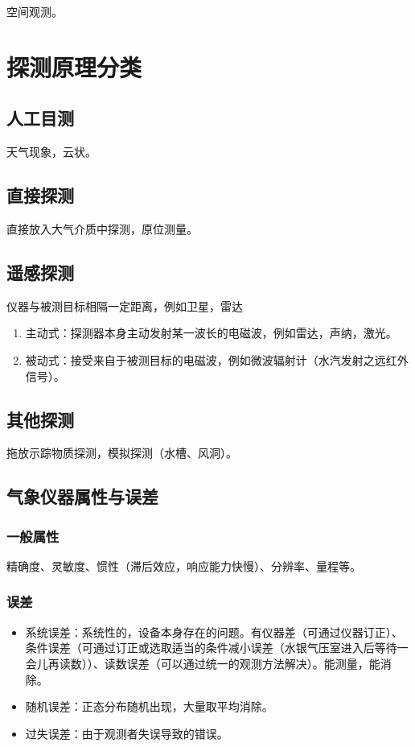 \documentclass[UTF8,11pt]{ctexbook}
\begin{document}
空间观测。


\section{探测原理分类}

\subsection{人工目测}

天气现象，云状。

\subsection{直接探测}

直接放入大气介质中探测，原位测量。

\subsection{遥感探测}

仪器与被测目标相隔一定距离，例如卫星，雷达
\begin{enumerate}
    \item 主动式：探测器本身主动发射某一波长的电磁波，例如雷达，声纳，激光。
    \item 被动式：接受来自于被测目标的电磁波，例如微波辐射计（水汽发射之远红外信号）。
\end{enumerate}

\subsection{其他探测}

拖放示踪物质探测，模拟探测（水槽、风洞）。

\subsection{气象仪器属性与误差}

\subsubsection{一般属性}

精确度、灵敏度、惯性（滞后效应，响应能力快慢）、分辨率、量程等。

\subsubsection{误差}
\begin{itemize}
    \item 系统误差：系统性的，设备本身存在的问题。有仪器差（可通过仪器订正）、条件误差（可通过订正或选取适当的条件减小误差（水银气压室进入后等待一会儿再读数））、读数误差（可以通过统一的观测方法解决）。能测量，能消除。
    \item 随机误差：正态分布随机出现，大量取平均消除。
    \item 过失误差：由于观测者失误导致的错误。
\end{itemize}
\end{document}
